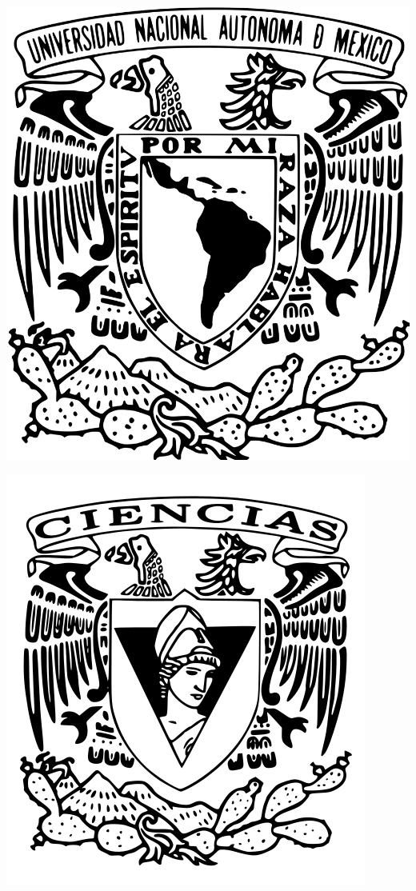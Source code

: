 \documentclass[14pt]{book}
\begin{document}
\begin{center}
  \newcommand{\HRule}{\rule{\linewidth}{0.5mm}}
  \begin{minipage}{0.48\textwidth}
    \begin{flushleft}
      \includegraphics[scale = 0.08]{images/logo_unam.png}
    \end{flushleft}
  \end{minipage}
  \begin{minipage}{0.48\textwidth}
    \begin{flushright}
      \includegraphics[scale =0.22]{images/logo_ciencias.png}

\end{flushright}
\end{minipage}
\end{center}
\end{document}
